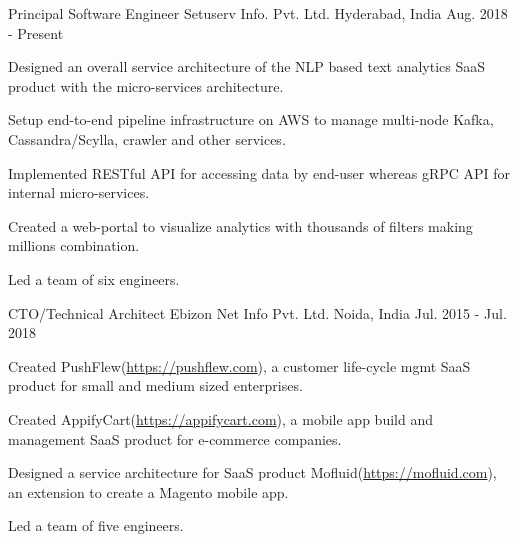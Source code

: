 

\begin{cventries}

  \cventry
    {Principal Software Engineer} %
    {Setuserv Info. Pvt. Ltd.} %
    {Hyderabad, India} %
    {Aug. 2018 - Present} %
    {
      \begin{cvitems} %
        \item {Designed an overall service architecture of the NLP based text analytics SaaS product with the micro-services architecture.}
        \item {Setup end-to-end pipeline infrastructure on AWS to manage multi-node Kafka, Cassandra/Scylla, crawler and other services.}
        \item {Implemented RESTful API for accessing data by end-user whereas gRPC API for internal micro-services.} 
        \item {Created a web-portal to visualize analytics with thousands of filters making millions combination.}
        \item {Led a team of six engineers.}
      \end{cvitems}
    }

  \cventry
    {CTO/Technical Architect} %
    {Ebizon Net Info Pvt. Ltd.} %
    {Noida, India} %
    {Jul. 2015 - Jul. 2018} %
    {
      \begin{cvitems} %
        \item {Created PushFlew(\href{https://pushflew.com}{https://pushflew.com}), a customer life-cycle mgmt SaaS product for small and medium sized enterprises.}
        \item {Created AppifyCart(\href{https://appifycart.com}{https://appifycart.com}), a mobile app build and management SaaS product for e-commerce companies.}
        \item {Designed a service architecture for SaaS product Mofluid(\href{https://mofluid.com}{https://mofluid.com}), an extension to create a Magento mobile app.}
        \item {Led a team of five engineers.}
      \end{cvitems}
    }


\end{cventries}
